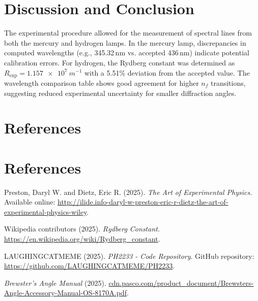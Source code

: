 \documentclass[12pt]{article}
\begin{document}
\section{Discussion and Conclusion}
The experimental procedure allowed for the measurement of spectral lines from both the mercury and hydrogen lamps. In the mercury lamp, discrepancies in computed wavelengths (e.g., 345.32\,nm vs. accepted 436\,nm) indicate potential calibration errors. For hydrogen, the Rydberg constant was determined as \(R_{\text{exp}} = \SI{1.157e7}{m^{-1}}\) with a 5.51\% deviation from the accepted value. The wavelength comparison table shows good agreement for higher \(n_f\) transitions, suggesting reduced experimental uncertainty for smaller diffraction angles.

\section*{References}
\section*{References}
\begin{thebibliography}{9}
Preston, Daryl W. and Dietz, Eric R. (2025). \textit{The Art of Experimental Physics}. Available online: \url{http://ilide.info-daryl-w-preston-eric-r-dietz-the-art-of-experimental-physics-wiley}.

Wikipedia contributors (2025). \textit{Rydberg Constant}. \url{https://en.wikipedia.org/wiki/Rydberg_constant}.

LAUGHINGCATMEME (2025). \textit{PH2233 - Code Repository}. GitHub repository: \url{https://github.com/LAUGHINGCATMEME/PH2233}.

\textit{Brewster's Angle Manual} (2025). \url{cdn.pasco.com/product_document/Brewsters-Angle-Accessory-Manual-OS-8170A.pdf}.
\end{thebibliography}
\end{document}
